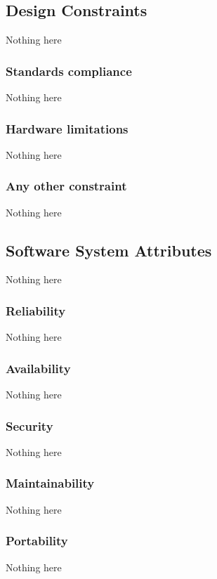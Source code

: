 \subsection{Design Constraints}
Nothing here

\subsubsection{Standards compliance}
Nothing here

\subsubsection{Hardware limitations}
Nothing here

\subsubsection{Any other constraint}
Nothing here


\subsection{Software System Attributes}
Nothing here

\subsubsection{Reliability}
Nothing here

\subsubsection{Availability}
Nothing here

\subsubsection{Security}
Nothing here

\subsubsection{Maintainability}
Nothing here

\subsubsection{Portability}
Nothing here
